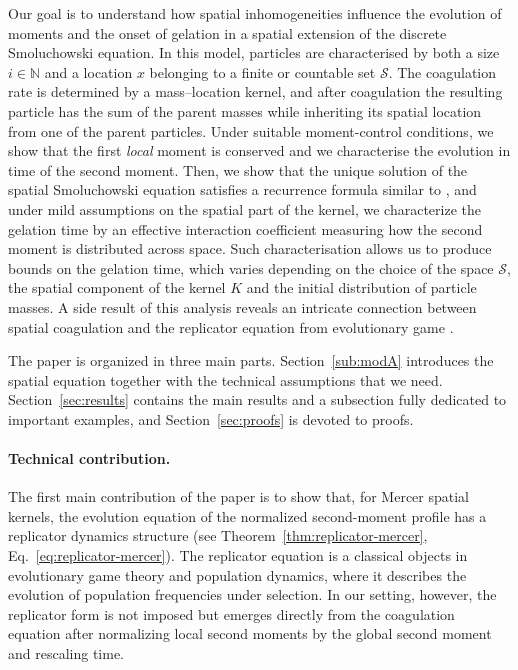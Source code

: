 \documentclass[12pt,twoside]{article}
\begin{document}
Our goal is to understand how spatial inhomogeneities influence the evolution of moments and the onset of gelation in a spatial extension of the discrete Smoluchowski equation.
In this model, particles are characterised by both a size $i\in\mathbb N$ and a location $x$ belonging to a finite or countable set $\mathcal{S}$. The coagulation rate is determined by a mass--location kernel, and after coagulation the resulting particle has the sum of the parent masses while inheriting its spatial location from one of the parent particles. Under suitable moment-control conditions, we show that the first \emph{local} moment is conserved and we characterise the evolution in time of the second moment. Then, we show that  
the unique solution of the spatial Smoluchowski equation satisfies a recurrence formula similar to \cite[Theorem~2.1 (iii)]{GK}, and under mild assumptions on the spatial part of the kernel, we characterize the gelation time by an effective interaction coefficient measuring how the second moment is distributed across space. Such characterisation allows us to produce bounds on the gelation time, which varies depending on the choice of the space $\mathcal{S}$, the spatial component of the kernel $K$ and the initial distribution of particle masses. A side result of this analysis reveals an intricate connection between spatial coagulation and the replicator equation from evolutionary game  \cite{hofbauer1998}. 

The paper is organized in three main parts. Section~\ref{sub:modA} introduces the spatial equation together with the technical assumptions that we need. Section~\ref{sec:results} contains the main results and a subsection fully dedicated to important examples, and Section~\ref{sec:proofs} is devoted to proofs.

\paragraph{Technical contribution.}
The first main contribution of the paper is to show that, for Mercer spatial kernels, the evolution equation of the normalized second-moment profile has a replicator dynamics structure (see Theorem~\ref{thm:replicator-mercer}, Eq.~\ref{eq:replicator-mercer}). 
The replicator equation \cite{hofbauer1998} is a classical objects in evolutionary game theory and population dynamics, where it describes the evolution of population frequencies under selection. In our setting, however, the replicator form is not imposed but emerges directly from the coagulation equation after normalizing local second moments by the global second moment and rescaling time.
\end{document}
